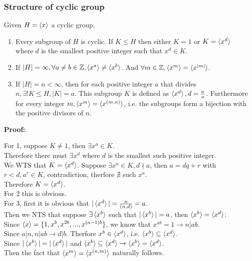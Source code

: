 \documentclass{article}
\begin{document}
\subsubsection*{Structure of cyclic group}
Given $H = \braket{x}$ a cyclic group,
\begin{enumerate}
    \item Every subgroup of $H$ is cyclic. If $K \leq H$ then either $K = 1$ or $K = \braket{x^d}$ where $d$ is the smallest positive integer such that $x^d \in K$.
    \item If $|H| = \infty, \forall a \neq b \in \mathbb{Z}, \braket{x^a} \neq \braket{x^b}$. And $\forall m \in \mathbb{Z}, \braket{x^m} = \braket{x^{|m|}}$.
    \item If $|H| = n < \infty$, then for each positive integer $a$ that divides $n, \exists! K \leq H, |K|= a$. This subgroup $K$ is defined as $\braket{x^d}, d = \frac{n}{a}$. Furthermore for every integer $m, \braket{x^m} = \braket{x^{(m, n)}}$, i.e. the subgroups form a bijection with the positive divisors of $n$.
\end{enumerate}
\textbf{Proof:}
\begin{addmargin}[1em]{0em}
    For 1, suppose $K \neq 1$, then $\exists x^a \in K$.\\
    Therefore there must $\exists x^d$ where $d$ is the smallest such positive integer.\\
    We WTS that $K = \braket{x^d}$. Suppose $\exists x^a \in K, d \nmid a$, then $a = dq + r$ with $r < d, a^r \in K$, contradiction, therfore $\nexists$ such $x^a$.\\
    Therefore $K = \braket{x^d}$.\\
    For 2 this is obvious.\\
    For 3, first it is obvious that $|\braket{x^d}| = \frac{n}{(n, d)} = a$.\\
    Then we NTS that suppose $\exists \braket{x^b}$ such that $|\braket{x^b}| = a$, then $\braket{x^b} = \braket{x^d}$:\\
    Since $\braket{x} = \{1, x^b, x^{2b}, ..., x^{(a-1)b}\}$, we know that $x^{ab} = 1 \rightarrow n | ab$.\\
    Since $a | n, n | ab \rightarrow d | b$. Therfore $x^b \in \braket{x^d}$, i.e. $\braket{x^b} \subseteq \braket{x^d}$.\\
    Since $|\braket{x^b}| = |\braket{x^d}|$ and $\braket{x^b} \subseteq \braket{x^d} \rightarrow \braket{x^b} = \braket{x^d}$.\\
    Then the fact that $\braket{x^m} = \braket{x^{(n, m)}}$ naturally follows.
\end{addmargin}
\end{document}
